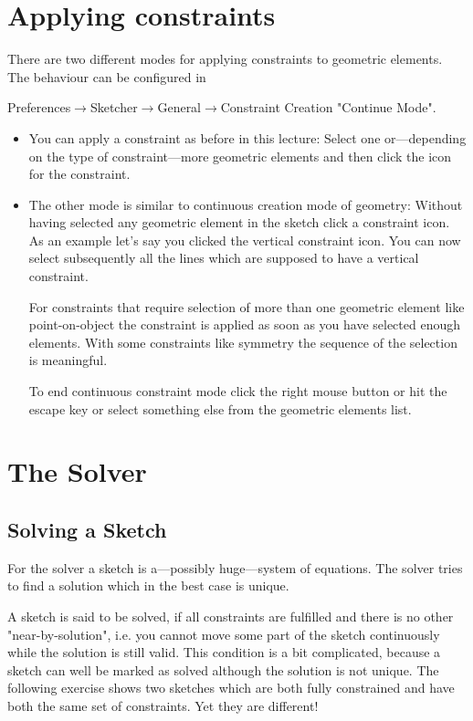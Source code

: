 \documentclass[12pt,titlepage]{article}
\newcommand{\menu}{\mbox{$\rightarrow$}}
\begin{document}
\section{Applying constraints} \label{ApplyingConstraints} There are two different modes for applying constraints to geometric elements. The behaviour can be configured in

Preferences\menu Sketcher\menu General\menu Constraint Creation "Continue Mode".\label{continueConstraints}


\begin{itemize} \item You can apply a constraint as before in this lecture: Select one or---depending on the type of constraint---more geometric elements and then click the icon for the constraint. \item The other mode is similar to continuous creation mode of geometry: Without having selected any geometric element in the sketch click a constraint icon. As an example let's say you clicked the vertical constraint icon. You can now select subsequently all the lines which are supposed to have a vertical constraint.
	
	For constraints that require selection of more than one geometric element like point-on-object the constraint is applied as soon as you have selected enough elements. With some constraints like symmetry the sequence of the selection is meaningful.
	
	To end continuous constraint mode click the right mouse button or hit the escape key or select something else from the geometric elements list. \end{itemize}

\section{The Solver} \subsection{Solving a Sketch} For the solver a sketch is a---possibly huge---system of equations. The solver tries to find a solution which in the best case is unique.

A sketch is said to be solved, if all constraints are fulfilled and there is no other "near-by-solution", i.e. you cannot move some part of the sketch continuously while the solution is still valid. This condition is a bit complicated, because a sketch can well be marked as solved although the solution is not unique. The following exercise shows two sketches which are both fully constrained and have both the same set of constraints. Yet they are different!
\end{document}
